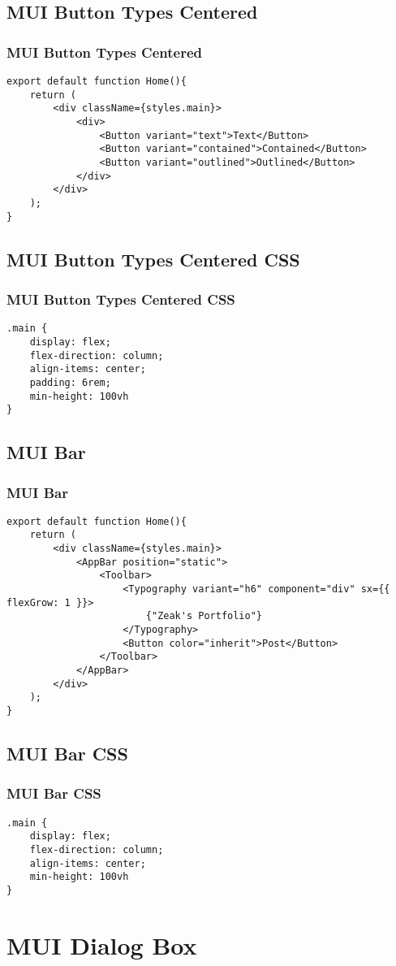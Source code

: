\documentclass{beamer}
\begin{document}
\subsection{MUI Button Types Centered}
\begin{frame}[fragile]
\frametitle{MUI Button Types Centered}
\begin{lstlisting}
export default function Home(){
    return (
        <div className={styles.main}>
            <div>
                <Button variant="text">Text</Button>
                <Button variant="contained">Contained</Button>
                <Button variant="outlined">Outlined</Button>
            </div>
        </div>
    );
}
\end{lstlisting}
\end{frame}

\subsection{MUI Button Types Centered CSS}
\begin{frame}[fragile]
\frametitle{MUI Button Types Centered CSS}
\begin{lstlisting}
.main {
    display: flex;
    flex-direction: column;
    align-items: center;
    padding: 6rem;
    min-height: 100vh
}
\end{lstlisting}
\end{frame}

\fontsize{6pt}{6pt}\selectfont
\subsection{MUI Bar}
\begin{frame}[fragile]
\frametitle{MUI Bar}
\begin{lstlisting}
export default function Home(){
    return (
        <div className={styles.main}>
            <AppBar position="static">        
                <Toolbar>
                    <Typography variant="h6" component="div" sx={{ flexGrow: 1 }}>
                        {"Zeak's Portfolio"}
                    </Typography>
                    <Button color="inherit">Post</Button>
                </Toolbar>
            </AppBar>
        </div>
    );
}
\end{lstlisting}
\end{frame}

\fontsize{8pt}{8pt}\selectfont
\subsection{MUI Bar CSS}
\begin{frame}[fragile]
\frametitle{MUI Bar CSS}
\begin{lstlisting}
.main {
    display: flex;
    flex-direction: column;
    align-items: center;
    min-height: 100vh
}
\end{lstlisting}
\end{frame}

\fontsize{11pt}{11pt}\selectfont
\section{MUI Dialog Box}
\end{document}
